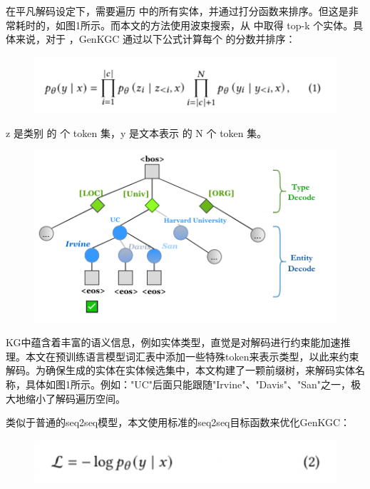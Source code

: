 \documentclass{article}
\begin{document}
\newpage

\par 在平凡解码设定下，需要遍历 中的所有实体，并通过打分函数来排序。但这是非常耗时的，如图1所示。而本文的方法使用波束搜索，从 中取得 top-k 个实体。具体来说，对于 ，GenKGC 通过以下公式计算每个 的分数并排序：

\begin{figure}[htp]
        \centering
        \includegraphics[width=16cm]{2.png}
        \label{pic7}
\end{figure}

\newpage

\par z 是类别 的 个 token 集，y 是文本表示 的 N 个 token 集。
\begin{figure}[htp]
        \centering
        \includegraphics[width=16cm]{3.png}
        \label{pic7}
\end{figure}

\par KG中蕴含着丰富的语义信息，例如实体类型，直觉是对解码进行约束能加速推理。本文在预训练语言模型词汇表中添加一些特殊token来表示类型，以此来约束解码。为确保生成的实体在实体候选集中，本文构建了一颗前缀树，来解码实体名称，具体如图1所示。例如："UC"后面只能跟随"Irvine"、"Davis"、"San"之一，极大地缩小了解码遍历空间。

类似于普通的seq2seq模型，本文使用标准的seq2seq目标函数来优化GenKGC：
\begin{figure}[htp]
        \centering
        \includegraphics[width=16cm]{4.png}
        \label{pic7}
\end{figure}
\end{document}
